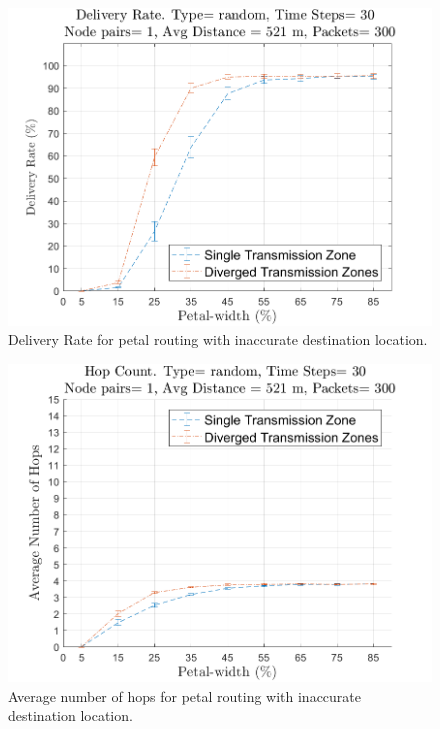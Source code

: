 \begin{figure}[hbtp]
\centering
\includegraphics[width=\simResultFigSize\textwidth]{ncsuthesis-0.6/Chapter-5/figs/mob_pe_DR_random.png}
\caption{Delivery Rate for petal routing with inaccurate destination location.}
\label{fig:mob_pe_DR_random}
\end{figure}

\begin{figure}[hbtp]
\centering
\includegraphics[width=\simResultFigSize\textwidth]{ncsuthesis-0.6/Chapter-5/figs/mob_pe_hops_random.png}
\caption{Average number of hops for petal routing with inaccurate destination location.}
\label{fig:mob_pe_hops_random}
\end{figure}

